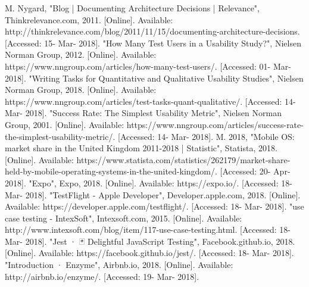 \documentclass[12pt,a4paper]{article}
\begin{document}
      
    \begin{thebibliography}{20}
       M. Nygard, "Blog | Documenting Architecture Decisions | Relevance", Thinkrelevance.com, 2011. [Online]. Available: http://thinkrelevance.com/blog/2011/11/15/documenting-architecture-decisions. [Accessed: 15- Mar- 2018].
       "How Many Test Users in a Usability Study?", Nielsen Norman Group, 2012. [Online]. Available: https://www.nngroup.com/articles/how-many-test-users/. [Accessed: 01- Mar- 2018].      
       "Writing Tasks for Quantitative and Qualitative Usability Studies", Nielsen Norman Group, 2018. [Online]. Available: https://www.nngroup.com/articles/test-tasks-quant-qualitative/. [Accessed: 14- Mar- 2018].
       "Success Rate: The Simplest Usability Metric", Nielsen Norman Group, 2001. [Online]. Available: https://www.nngroup.com/articles/success-rate-the-simplest-usability-metric/. [Accessed: 14- Mar- 2018].
       M. 2018, "Mobile OS: market share in the United Kingdom 2011-2018 | Statistic", Statista, 2018. [Online]. Available: https://www.statista.com/statistics/262179/market-share-held-by-mobile-operating-systems-in-the-united-kingdom/. [Accessed: 20- Apr- 2018].
       "Expo", Expo, 2018. [Online]. Available: https://expo.io/. [Accessed: 18- Mar- 2018].
       "TestFlight - Apple Developer", Developer.apple.com, 2018. [Online]. Available: https://developer.apple.com/testflight/. [Accessed: 18- Mar- 2018].
       "use case testing - IntexSoft", Intexsoft.com, 2015. [Online]. Available: http://www.intexsoft.com/blog/item/117-use-case-testing.html. [Accessed: 18- Mar- 2018].
       "Jest · 🃏 Delightful JavaScript Testing", Facebook.github.io, 2018. [Online]. Available: https://facebook.github.io/jest/. [Accessed: 18- Mar- 2018].
       "Introduction · Enzyme", Airbnb.io, 2018. [Online]. Available: http://airbnb.io/enzyme/. [Accessed: 19- Mar- 2018].
    \end{thebibliography}
    
\end{document}

